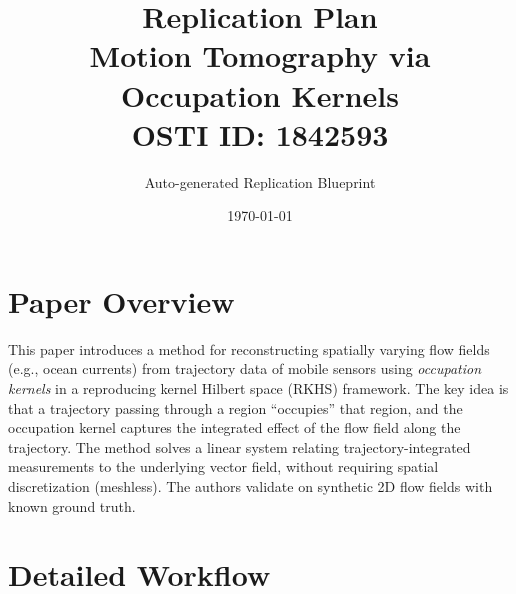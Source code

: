 \documentclass[11pt,a4paper]{article}
\title{\textbf{Replication Plan}\\[0.5em]
\large Motion Tomography via Occupation Kernels\\[0.3em]
\normalsize OSTI ID: 1842593}
\author{Auto-generated Replication Blueprint}
\date{\today}
\begin{document}
\maketitle
\tableofcontents
\newpage

\section{Paper Overview}
This paper introduces a method for reconstructing spatially varying flow fields (e.g., ocean currents) from trajectory data of mobile sensors using \emph{occupation kernels} in a reproducing kernel Hilbert space (RKHS) framework. The key idea is that a trajectory passing through a region ``occupies'' that region, and the occupation kernel captures the integrated effect of the flow field along the trajectory. The method solves a linear system relating trajectory-integrated measurements to the underlying vector field, without requiring spatial discretization (meshless). The authors validate on synthetic 2D flow fields with known ground truth.

\section{Detailed Workflow}
\end{document}
